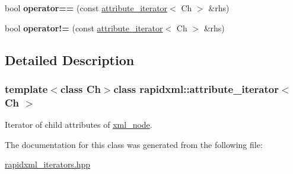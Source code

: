 \begin{DoxyCompactItemize}
\item 
\hypertarget{classrapidxml_1_1attribute__iterator_ab1dc8dd11d21e145a4e3f76d46aead0d}{bool {\bfseries operator==} (const \hyperlink{classrapidxml_1_1attribute__iterator}{attribute\-\_\-iterator}$<$ Ch $>$ \&rhs)}\label{classrapidxml_1_1attribute__iterator_ab1dc8dd11d21e145a4e3f76d46aead0d}

\item 
\hypertarget{classrapidxml_1_1attribute__iterator_a39e8cf336c324521fd9c720abf280d88}{bool {\bfseries operator!=} (const \hyperlink{classrapidxml_1_1attribute__iterator}{attribute\-\_\-iterator}$<$ Ch $>$ \&rhs)}\label{classrapidxml_1_1attribute__iterator_a39e8cf336c324521fd9c720abf280d88}

\end{DoxyCompactItemize}


\subsection{Detailed Description}
\subsubsection*{template$<$class Ch$>$class rapidxml\-::attribute\-\_\-iterator$<$ Ch $>$}

Iterator of child attributes of \hyperlink{classrapidxml_1_1xml__node}{xml\-\_\-node}. 

The documentation for this class was generated from the following file\-:\begin{DoxyCompactItemize}
\item 
\hyperlink{rapidxml__iterators_8hpp}{rapidxml\-\_\-iterators.\-hpp}\end{DoxyCompactItemize}
